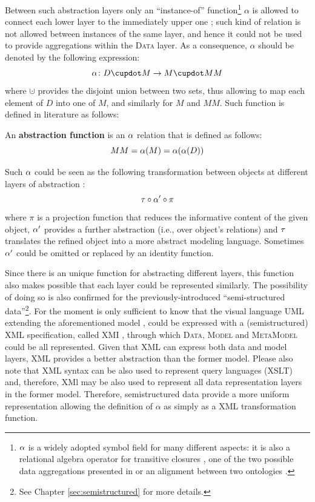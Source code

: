 Between such abstraction layers only an ``instance-of'' function\footnote{$\abstr$ is a widely adopted symbol field for many different aspects: it is also a relational algebra operator for transitive closures \cite{Alpha}, one of the two possible data aggregations presented in \cite{Johnson2011} or an alignment between two ontologies \cite{euzenat2013d}.} $\alpha$ is allowed to connect  each lower layer to the  immediately upper one \cite{mathmeta}; such kind of relation is not allowed  between instances of the same layer, and hence it could not be used to provide aggregations within the \textsc{Data} layer. As a consequence, $\alpha$ should be denoted by the following expression:
\[\abstr\colon \data\cupdot \model \to \model\cupdot \metamodel\]
where $\cupdot$ provides the disjoint union between two sets, thus allowing to map each element of $D$ into one of $M$, and similarly for $M$ and $MM$. Such function is defined in literature as follows:

\begin{definition}
	An \textbf{abstraction function} is an $\abstrTHIS$   relation that is
	defined as follows:
	\begin{equation}\label{eq:alayer}\metamodel=\abstr(\model)=\abstr(\abstr(\data))\end{equation}

	Such $\abstr$ could be seen as the following transformation between
	objects at different layers of abstraction \cite{kuhne06a}:
	\begin{equation}\label{eq:alpha}
	\ttransl \circ\abstr'\circ\pi
	\end{equation}
	where $\pi$ is a projection function that reduces the informative content of the
	given object, $\abstr'$ provides a further abstraction (i.e.,\; over object's
	relations) and $\ttransl$ translates the refined object into a more abstract
	modeling language. Sometimes \cite{kuhne06a} $\abstr'$ could be omitted or
	replaced by an identity function.
\end{definition}

Since there is an unique function for abstracting different layers, this function also makes possible that each layer could be represented similarly. The possibility of doing so is also confirmed for the previously-introduced  ``semi-structured data''\footnote{See Chapter \vref{sec:semistructured} for more details.}. For the moment is only sufficient to know that the visual language UML extending the aforementioned model \cite{OMG2011,OMG2011a}, could be expressed with a (semistructured) XML specification, called XMI \cite{XMI}, through which \textsc{Data}, \textsc{Model} and \textsc{MetaModel} could be all represented. Given that XML can express both data and model layers, XML provides a better abstraction than the former model. Please also note that XML syntax can be also used to represent query languages (XSLT) and, therefore, XMl may be also used to represent all data representation layers in the former model. Therefore, semistructured data provide a more uniform representation allowing the definition of $\alpha$ as simply as a XML transformation function. 


